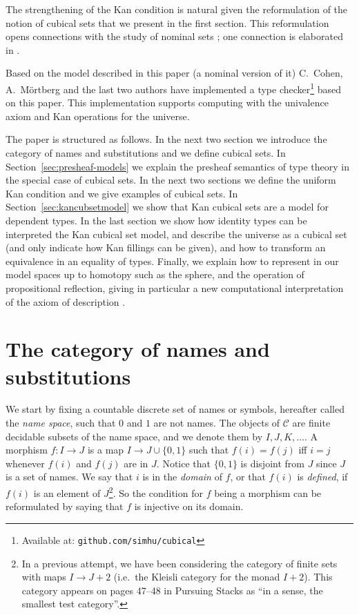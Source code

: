 \documentclass[10pt,a4paper]{article}
\newcommand{\CC}{{\mathcal C}}
\newcommand{\set}[1]{\{#1\}}
\begin{document}
The strengthening of the Kan condition is natural given the
reformulation of the notion of cubical sets that we present in the
first section. This reformulation opens connections with the study of
nominal sets \cite{pitts}; one connection is elaborated in
\cite{Pitts}.



Based on the model described in this paper (a nominal version of it)
C.~Cohen, A.~M\"ortberg and the last two authors have implemented a
type checker\footnote{Available at: {\tt github.com/simhu/cubical}}
based on this paper.  This implementation supports computing with the
univalence axiom and Kan operations for the universe.

The paper is structured as follows. In the next two section we
introduce the category of names and substitutions and we define
cubical sets.  In Section~\ref{sec:presheaf-models} we explain the
presheaf semantics of type theory in the special case of cubical
sets. In the next two sections we define the uniform Kan condition and
we give examples of cubical sets.  In Section~\ref{sec:kancubsetmodel}
we show that Kan cubical sets are a model for dependent types.  In the
last section we show how identity types can be interpreted the Kan
cubical set model, and describe the universe as a cubical set (and
only indicate how Kan fillings can be given), and how to transform an
equivalence in an equality of types.  Finally, we explain how to
represent in our model spaces up to homotopy such as the sphere, and
the operation of propositional reflection, giving in particular a new
computational interpretation of the axiom of description
\cite{Russell}.

\section{The category of names and substitutions}

 We start by fixing a countable discrete set of names or symbols, hereafter called the \emph{name space},
such that $0$ and $1$ are not names.
The objects of $\CC$ are finite decidable subsets of the name space,
and we denote them by $I,J,K,\dots$.
A morphism $f:I\to J$ is a map $I \to J\cup \set{0,1}$ such that $f(i) = f(j)$ if{f} $i=j$ whenever
$f(i)$ and $f(j)$ are in $J$. Notice that $\set{0,1}$ is disjoint from $J$ since $J$ is a set of
names. We say that $i$ is in the \emph{domain} of $f$, or that $f(i)$ is \emph{defined},
if $f(i)$ is an element of $J$\footnote%
{In a previous attempt, we have been considering the category of finite sets
with maps $I \to J+2$ (i.e.\ the Kleisli category for the monad $I+2$).
This category appears on pages 47--48 in Pursuing Stacks
\cite{Grothendieck} as ``in a sense, the smallest test category''.}.
So the condition for $f$ being a morphism can be reformulated by saying that $f$ is injective on its domain.
\end{document}
